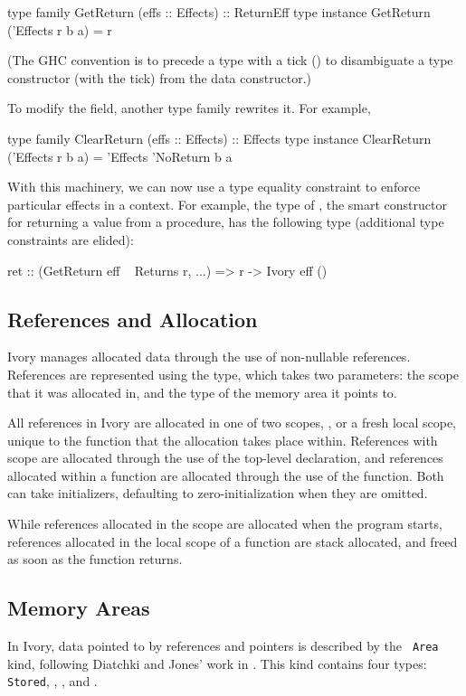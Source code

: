 \begin{code}
type family   GetReturn (effs :: Effects) :: ReturnEff
type instance GetReturn ('Effects r b a) = r
\end{code}

\noindent
(The GHC convention is to precede a type with a tick () to disambiguate a
type constructor (with the tick) from the data constructor.)

To modify the field, another type family rewrites it. For example,

\begin{code}
type family   ClearReturn (effs :: Effects) :: Effects
type instance ClearReturn ('Effects r b a) =
  'Effects 'NoReturn b a
\end{code}

With this machinery, we can now use a type equality constraint to enforce
particular effects in a context. For example, the type of , the smart
constructor for returning a value from a procedure, has the following type
(additional type constraints are elided):

\begin{code}
ret :: (GetReturn eff ~ Returns r, ...)
    => r -> Ivory eff ()
\end{code}


\subsection{References and Allocation}
\label{sec:ref}
Ivory manages allocated data through the use of non-nullable references.
References are represented using the  type, which takes two parameters:
the scope that it was allocated in, and the type of the memory area it points
to.

All references in Ivory are allocated in one of two scopes, , or a
fresh local scope, unique to the function that the allocation takes place
within.  References with  scope are allocated through the use of the
 top-level declaration, and references allocated within a function are
allocated through the use of the  function.  Both can take
initializers, defaulting to zero-initialization when they are omitted.

While references allocated in the  scope are allocated when the
program starts, references allocated in the local scope of a function are stack
allocated, and freed as soon as the function returns.

\subsection{Memory Areas}
In Ivory, data pointed to by references and pointers is described by the {\tt
Area} kind, following Diatchki and Jones' work in \cite{memareas}.  This kind
contains four types: {\tt Stored}, , , and .

